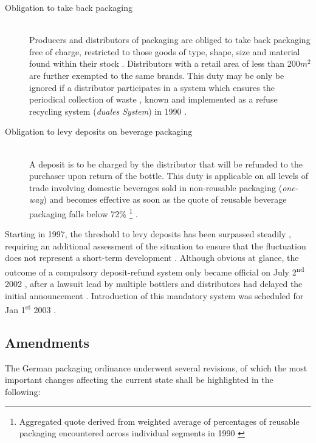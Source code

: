 \begin{description}
	\item[Obligation to take back packaging]
	\hfill \\
	Producers and distributors of packaging are obliged to take back packaging free of charge, restricted to those goods of type, shape, size and material found within their stock \cite[§§~4-6]{verpackV1991}. Distributors with a retail area of less than 200$m^2$ are further exempted to the same brands. This duty may be only be ignored if a distributor participates in a system which ensures the periodical collection of waste \cite[§~6]{verpackV1991}, known and implemented as a refuse recycling system (\textit{duales System}) in 1990 \cite{Hartlep2011Recycling}.
	\item[Obligation to levy deposits on \gls{beverage packaging}]
	\hfill \\
	A deposit is to be charged by the distributor that will be refunded to the purchaser upon return of the bottle. This duty is applicable on all levels of trade involving domestic beverages sold in non-\gls{reusable packaging} (\textit{one-way}) \cite[§~7]{verpackV1991} and becomes effective as soon as the quote of reusable beverage packaging falls below 72\% \footnote{Aggregated quote derived from weighted average of percentages of reusable packaging encountered across individual segments in 1990 \cite[§~9]{verpackV1991} \cite[p.~134]{Rummler/Schutt 1991}} \cite[§~9]{verpackV1991}.
\end{description}


Starting in 1997, the threshold to levy deposits has been surpassed steadily \cite[p.~1]{BMU 2010a}, requiring an additional assessment of the situation to ensure that the fluctuation does not represent a short-term development \cite[§ 9]{verpackV1991} \cite[p.~5]{Hartlep2011Recycling}. Although obvious at glance, the outcome of a compulsory deposit-refund system only became official on July 2\textsuperscript{nd} 2002 \cite[p.~49]{Geyer/Smoltczyk 2003}, after a lawsuit lead by multiple bottlers and distributors had delayed the initial announcement \cite{spon2011handel}. Introduction of this mandatory system was scheduled for Jan 1\textsuperscript{st} 2003 \cite[p.~53]{Geyer/Smoltczyk 2003}.

\subsection{Amendments}
The German packaging ordinance underwent several revisions, of which the most important changes affecting the current state shall be highlighted in the following:

